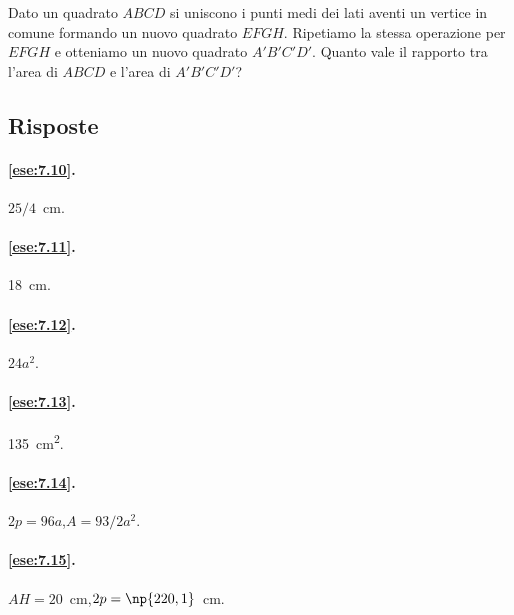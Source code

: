 \begin{multicols}{2}
%

\begin{esercizio}
\label{ese:7.113}
Dato un quadrato \(ABCD\) si uniscono i punti medi dei lati aventi un 
vertice in comune formando un nuovo quadrato \(EFGH\). Ripetiamo la 
stessa operazione per \(EFGH\) e otteniamo un nuovo quadrato 
\(A'B'C'D'\). Quanto vale il rapporto tra l'area di \(ABCD\) e l'area di 
\(A'B'C'D'\)?
\end{esercizio}

\end{multicols}


\subsection{Risposte}

\begingroup
\hypersetup{linkcolor=black}

\paragraph{\ref{ese:7.10}.}
\(25/4\)~cm.

\paragraph{\ref{ese:7.11}.}
18~cm.

\paragraph{\ref{ese:7.12}.}
\(24a^2\).

\paragraph{\ref{ese:7.13}.}
135~cm\textsuperscript{2}.

\paragraph{\ref{ese:7.14}.}
\(2p=96a\),\quad \(A=93/2a^2\).

\paragraph{\ref{ese:7.15}.}
\(AH=20\)~cm,\quad \(2p=\np{220,1}\)~cm.

